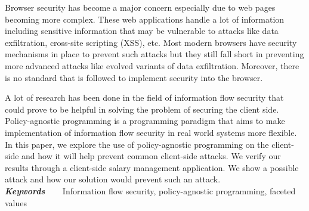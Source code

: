\providecommand{\keywords}[1]{\textbf{\textit{Keywords~~~}} #1}

Browser security has become a major concern especially due to web pages becoming
more complex. These web applications handle a lot of information including
sensitive information that may be vulnerable to attacks like data exfiltration,
cross-site scripting (XSS), etc. Most modern browsers have security mechanisms in
place to prevent such attacks but they still fall short in preventing more advanced
attacks like evolved variants of data exfiltration. Moreover, there is no standard
that is followed to implement security into the browser.
\par A lot of research has been done in the field of information flow security
that could prove to be helpful in solving the problem of securing the client side.
Policy-agnostic programming is a programming paradigm that aims to make implementation
of information flow security in real world systems more flexible. In this paper,
we explore the use of policy-agnostic programming on the client-side and how it
will help prevent common client-side attacks. We verify our results through a
client-side salary management application. We show a possible attack and how
our solution would prevent such an attack.\\
\keywords{Information flow security, policy-agnostic programming, faceted values}
